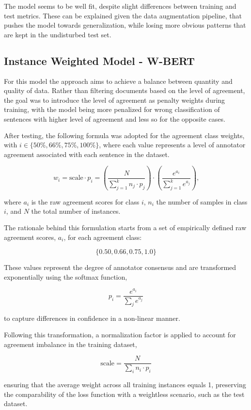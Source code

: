 \documentclass[conference]{IEEEtran}
\begin{document}
The model seems to be well fit, despite slight differences between training and test metrics. These can be explained given the data augmentation pipeline, that pushes the model towards generalization, while losing more obvious patterns that are kept in the undisturbed test set. 

\subsection{Instance Weighted Model - W-BERT}

For this model the approach aims to achieve a balance between quantity and quality of data. Rather than filtering documents based on the level of agreement, the goal was to introduce the level of agreement as penalty weights during training, with the model being more penalized for wrong classification of sentences with higher level of agreement and less so for the opposite cases.

After testing, the following formula was adopted for the agreement class weights, with $i \in \{50\%, 66\%, 75\%, 100\%\}$, where each value represents a level of annotator agreement associated with each sentence in the dataset.

$$
w_i = \text{scale} \cdot p_i = \left( \frac{N}{\sum_{j=1}^k n_j \cdot p_j} \right) \cdot  \left( \frac{e^{a_i}}{\sum_{j=1}^k e^{a_j}} \right) \text{,}
$$

\noindent where $a_i$ is the raw agreement scores for class $i$, $n_i$ the number of samples in class $i$, and $N$ the total number of instances.

The rationale behind this formulation starts from a set of empirically defined raw agreement scores, $a_i$, for each agreement class:

$$
\{0.50, 0.66, 0.75, 1.0\}
$$

These values represent the degree of annotator consensus and are transformed exponentially using the softmax function,

$$
p_i = \frac{e^{a_i}}{\sum_j e^{a_j}}
$$

\noindent to capture differences in confidence in a non-linear manner.

Following this transformation, a normalization factor is applied to account for agreement imbalance in the training dataset,

$$
\text{scale} = \frac{N}{\sum_i n_i \cdot p_i}
$$

\noindent ensuring that the average weight across all training instances equals 1, preserving the comparability of the loss function with a weightless scenario, such as the test dataset.
\end{document}
